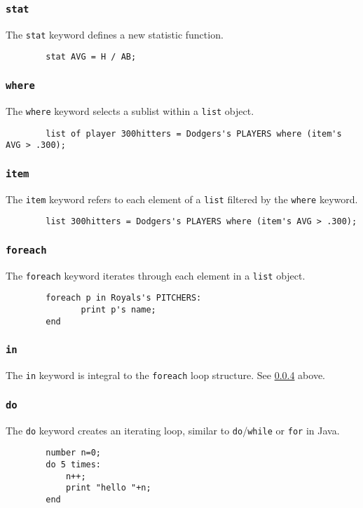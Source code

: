 \subsubsection{\texttt{stat}}
The \texttt{stat} keyword defines a new statistic function. 
\begin{verbatim}
        stat AVG = H / AB;
\end{verbatim}

\subsubsection{\texttt{where}}
The \texttt{where} keyword selects a sublist within a \texttt{list} object. 
\begin{verbatim}
        list of player 300hitters = Dodgers's PLAYERS where (item's AVG > .300);
\end{verbatim}

\subsubsection{\texttt{item}}
The \texttt{item} keyword refers to each element of a \texttt{list} filtered by the \texttt{where} keyword. 
\begin{verbatim}
        list 300hitters = Dodgers's PLAYERS where (item's AVG > .300);
\end{verbatim}

\subsubsection{\texttt{foreach}} \label{foreach}
The \texttt{foreach} keyword iterates through each element in a \texttt{list} object. 
\begin{verbatim}
        foreach p in Royals's PITCHERS: 
               print p's name;
        end
\end{verbatim}

\subsubsection{\texttt{in}}
The \texttt{in} keyword is integral to the \texttt{foreach} loop structure. See \ref{foreach} above.

\subsubsection{\texttt{do}} \label{do}
The \texttt{do} keyword creates an iterating loop, similar to \texttt{do}/\texttt{while} or \texttt{for} in Java.
\begin{verbatim}
        number n=0;
        do 5 times:
            n++;
            print "hello "+n;
        end
\end{verbatim}

